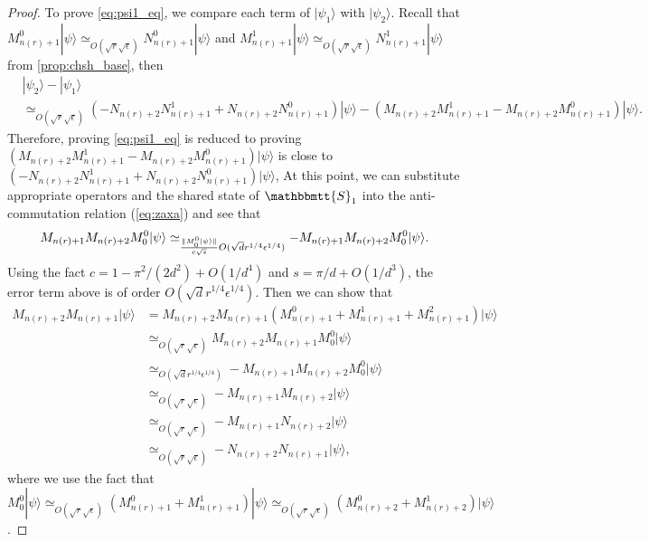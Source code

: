 \documentclass[11pt,letterpaper]{article}
\newcommand{\ket}[1]{|#1\rangle}
\DeclarePairedDelimiter{\norm}{\lVert}{\rVert}
\newcommand{\1}{\mathbb{1}}
\newcommand{\nr}{n(r)}
\newcommand{\bS}{\mathbbmtt{S}}
\newcommand{\se}{\sqrt{\epsilon}}
\newcommand{\qe}{\epsilon^{1/4}}
\newcommand{\sd}{\sqrt{d}}
\newcommand{\sr}{\sqrt{r}}
\newcommand{\qr}{r^{1/4}}
\newcommand{\appd}[1]{\simeq_{#1}}
\theoremstyle{definition}
\begin{document}
\begin{proof}
	To prove \cref{eq:psi1_eq}, we compare each term of $\ket{\psi_1}$
	with $\ket{\psi_2}$.
	Recall that $M_{\nr+1}^0 \ket{\psi} \appd{O(\sr \se)} N_{\nr+1}^0 \ket{\psi}$ 
	and $M_{\nr+1}^1 \ket{\psi} \appd{O(\sr \se)} N_{\nr+1}^1 \ket{\psi}$ from \cref{prop:chsh_base},
	then 
	\begin{align*}
	    &\ket{\psi_2} - \ket{\psi_1} \\
	    &\appd{O(\sr \se)}
	    (- N_{\nr+2}N_{\nr+1}^1+N_{\nr+2}N_{\nr+1}^0)\ket{\psi}
	    - (M_{\nr+2}M_{\nr+1}^1 - M_{\nr+2}M_{\nr+1}^0) \ket{\psi}.
	\end{align*}
	Therefore, proving \cref{eq:psi1_eq} 
	is reduced to proving
	$(M_{\nr+2}M_{\nr+1}^1 - M_{\nr+2}M_{\nr+1}^0) \ket{\psi}$ is close to $(- N_{\nr+2}N_{\nr+1}^1+N_{\nr+2}N_{\nr+1}^0)\ket{\psi}$,
	At this point, we can 
	substitute appropriate operators and the shared 
	state of $\bS_1$ into 
	the anti-commutation relation (\cref{eq:zaxa})
	and see that 
	\begin{align*}
		M_{\nr+1}M_{\nr+2} M_0^0 \ket{\psi} \appd{\frac{\norm{M_0^0\ket{\psi}}}{c\sqrt{s}}O(\sd\qr\qe)} -M_{\nr+1}M_{\nr+2} M_0^0 \ket{\psi}.
	\end{align*}
	Using the fact $c = 1 - \pi^2/(2d^2) + O(1/d^4)$ and $s = \pi/d + O(1/d^3)$, the error term above is of order $O(\sd \qr \qe)$.
	Then we can show that 
	\begin{align*}
		M_{\nr+2}M_{\nr+1}\ket{\psi} &= M_{\nr+2}M_{\nr+1}(M_{\nr+1}^0 + M_{\nr+1}^1+M_{\nr+1}^2)\ket{\psi} \\
			&\appd{O(\sr\se)} M_{\nr+2}M_{\nr+1} M_0^0 \ket{\psi} \\
			&\appd{O(\sd \qr \qe)} -M_{\nr+1}M_{\nr+2} M_0^0 \ket{\psi}\\
			&\appd{O(\sr \se)} -M_{\nr+1}M_{\nr+2} \ket{\psi} \\
			&\appd{O(\sr \se)} -M_{\nr+1} N_{\nr+2} \ket{\psi} \\
			&\appd{O(\sr \se)} -N_{\nr+2} N_{\nr+1} \ket{\psi},
	\end{align*}
	where we use the fact that $M_0^0 \ket{\psi} \appd{O(\sr \se)} (M_{\nr+1}^0+M_{\nr+1}^1)\ket{\psi} \appd{O(\sr \se)}
	(M_{\nr+2}^0+M_{\nr+2}^1) \ket{\psi}$.


\end{proof}
\end{document}
